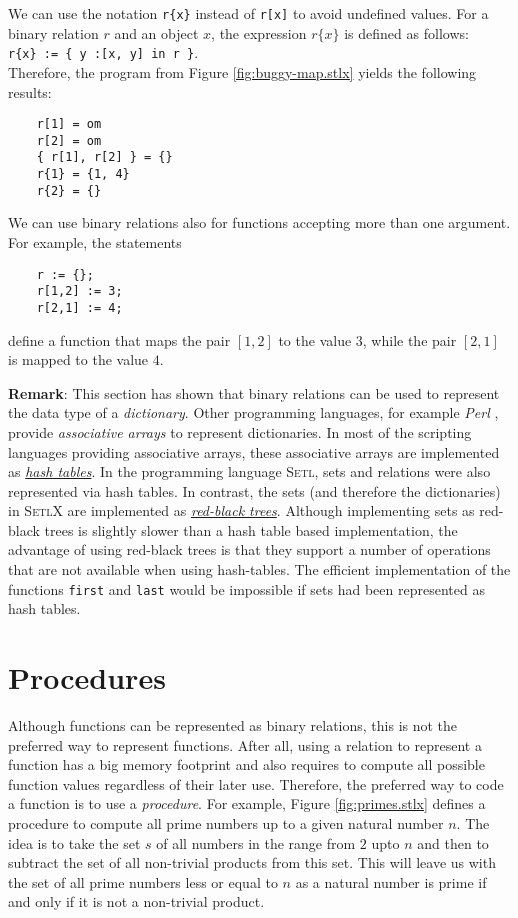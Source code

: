 We can use the notation  \texttt{r\{x\}} instead of \texttt{r[x]} to avoid undefined values.
For a binary relation $r$ and an object $x$, the expression $r\{x\}$ is defined as
follows: 
\\[0.2cm]
\hspace*{1.3cm} 
\texttt{r\{x\} := \{ y :[x, y] in r \}}.
\\[0.2cm]
Therefore, the  program from Figure \ref{fig:buggy-map.stlx} yields the following results:
\begin{verbatim}
    r[1] = om
    r[2] = om
    { r[1], r[2] } = {}
    r{1} = {1, 4}
    r{2} = {}
\end{verbatim}

We can use binary relations also for functions accepting more than one argument.  For example, the
statements
\begin{verbatim}
    r := {};
    r[1,2] := 3;
    r[2,1] := 4;
\end{verbatim}
define a function that maps the pair $[1,2]$ to the value $3$, while the pair $[2,1]$ is mapped to
the value $4$.

\noindent
\textbf{Remark}:
This section has shown that binary relations can be used to represent the data type of a
\emph{dictionary}.  Other programming languages, for example \textsl{Perl} \cite{Wall92},
provide \emph{associative arrays} to represent dictionaries.  In most of the scripting languages
providing associative arrays, these associative arrays are implemented as 
\href{http://en.wikipedia.org/wiki/Hash_table}{\emph{hash tables}}.  In the programming language
\textsc{Setl}, sets and relations were also represented via hash tables.
In contrast, the sets (and therefore the dictionaries) in \textsc{SetlX} are implemented as 
\href{http://en.wikipedia.org/wiki/Red-black_tree}{\emph{red-black trees}}.
Although implementing sets as red-black trees is slightly slower than a hash table based
implementation, the advantage of using red-black trees is that they support a number of operations
that are not available when using hash-tables.  The efficient implementation of the functions \texttt{first}
and \texttt{last} would be impossible if sets had been represented as hash tables.


\section{Procedures}
Although functions can be represented as binary relations, this is not the preferred way
to represent functions.  After all, using a relation to represent a function
has a big memory footprint and also requires to compute all possible function
values regardless of their later use.  Therefore, the preferred way to code a function is
to use a \emph{procedure}.  For example, Figure \ref{fig:primes.stlx} defines a procedure
to compute all 
prime numbers up to a given natural number $n$.  The idea is to take the set $s$ of all numbers in
the range from $2$ upto $n$ and then to subtract the set of all non-trivial
products from this set.  This will leave us with the set of all prime numbers less or
equal to $n$ as a natural number is prime if and only if it is not a non-trivial product.

